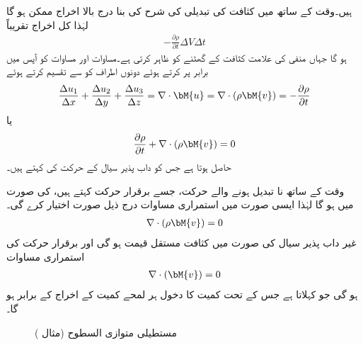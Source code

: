 ہیں۔وقت کے ساتھ  میں  کثافت کی تبدیلی کی شرح کی بنا درج بالا اخراج ممکن ہو گا لہٰذا کل اخراج تقریباً
\begin{align}\label{مساوات_الاحصاء_اخراج_ب}
-\frac{\partial \rho}{\partial t} \Delta V\Delta t
\end{align}  
ہو گا جہاں منفی کی علامت کثافت کے گھٹنے کو ظاہر کرتی ہے۔مساوات  اور مساوات  کو آپس میں برابر پر کرتے ہوئے دونوں اطراف کو  سے تقسیم کرتے ہوئے
\begin{align*}
\frac{\Delta u_1}{\Delta x}+\frac{\Delta u_2}{\Delta y}+\frac{\Delta u_3}{\Delta z}=\nabla \cdot \bM{u}=\nabla \cdot (\rho \bM{v})=-\frac{\partial \rho}{\partial t}
\end{align*}
یا
\begin{align}\label{مساوات_الاحصاء_استمراری}
\frac{\partial \rho}{\partial t}+\nabla \cdot (\rho \bM{v})=0
\end{align}
حاصل ہوتا ہے جس کو داب پذیر سیال کے حرکت کی   کہتے ہیں۔

وقت کے ساتھ نا تبدیل ہونے والے حرکت، جسے برقرار حرکت کہتے ہیں، کی صورت میں  ہو گا لہٰذا ایسی صورت میں  استمراری مساوات  درج ذیل صورت اختیار کرے گی۔
\begin{align}
\nabla \cdot(\rho \bM{v})=0
\end{align}
غیر داب  پذیر سیال کی صورت میں کثافت  مستقل قیمت ہو گی اور برقرار حرکت کی استمراری مساوات
\begin{align}
\nabla \cdot( \bM{v})=0
\end{align}
ہو گی جو  کہلاتا ہے جس کے تحت کمیت کا دخول ہر لمحے  کمیت کے اخراج کے برابر ہو گا۔
\begin{figure}
\centering
{}
\caption{مستطیلی متوازی السطوح (مثال )}
\label{شکل_مثال_الاحصاء_حرکت_سیال}
\end{figure}

